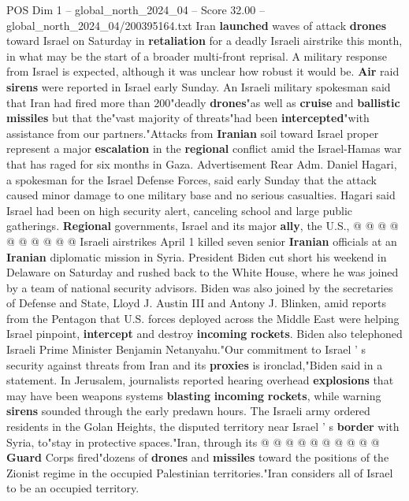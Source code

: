 \begin{textsample}{POS Dim 1 – global\_north\_2024\_04 – Score 32.00 – global\_north\_2024\_04/200395164.txt}  \label{ex:f1_pos_151}
Iran \textbf{launched} waves of attack \textbf{drones} toward Israel on Saturday in \textbf{retaliation} for a deadly Israeli airstrike this month, in what may be the start of a broader multi-front reprisal.
A military response from Israel is expected, although it was unclear how robust it would be. \textbf{Air} raid \textbf{sirens} were reported in Israel early Sunday.
An Israeli military spokesman said that Iran had fired more than 200"deadly \textbf{drones}"as well as \textbf{cruise} and \textbf{ballistic} \textbf{missiles} but that the"vast majority of threats"had been \textbf{intercepted}"with assistance from our partners."Attacks from \textbf{Iranian} soil toward Israel proper represent a major \textbf{escalation} in the \textbf{regional} conflict amid the Israel-Hamas war that has raged for six months in Gaza.
Advertisement Rear Adm.
Daniel Hagari, a spokesman for the Israel Defense Forces, said early Sunday that the attack caused minor damage to one military base and no serious casualties.
Hagari said Israel had been on high security alert, canceling school and large public gatherings. \textbf{Regional} governments, Israel and its major \textbf{ally}, the U.S., @ @ @ @ @ @ @ @ @ @ Israeli airstrikes April 1 killed seven senior \textbf{Iranian} officials at an \textbf{Iranian} diplomatic mission in Syria.
President Biden cut short his weekend in Delaware on Saturday and rushed back to the White House, where he was joined by a team of national security advisors.
Biden was also joined by the secretaries of Defense and State, Lloyd J.
Austin III and Antony J.
Blinken, amid reports from the Pentagon that U.S. forces deployed across the Middle East were helping Israel pinpoint, \textbf{intercept} and destroy \textbf{incoming} \textbf{rockets}.
Biden also telephoned Israeli Prime Minister Benjamin Netanyahu."Our commitment to Israel ' s security against threats from Iran and its \textbf{proxies} is ironclad,"Biden said in a statement.
In Jerusalem, journalists reported hearing overhead \textbf{explosions} that may have been weapons systems \textbf{blasting} \textbf{incoming} \textbf{rockets}, while warning \textbf{sirens} sounded through the early predawn hours.
The Israeli army ordered residents in the Golan Heights, the disputed territory near Israel ' s \textbf{border} with Syria, to"stay in protective spaces."Iran, through its @ @ @ @ @ @ @ @ @ @ \textbf{Guard} Corps fired"dozens of \textbf{drones} and \textbf{missiles} toward the positions of the Zionist regime in the occupied Palestinian territories."Iran considers all of Israel to be an occupied territory.

\end{textsample}
